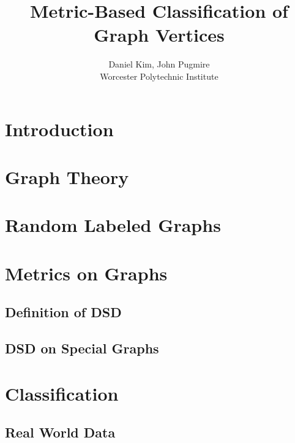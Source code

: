 \documentclass[11pt,oneside]{report}
\theoremstyle{definition}
\begin{document}
\title{Metric-Based Classification of Graph Vertices}
\author{Daniel Kim, John Pugmire\\Worcester Polytechnic Institute\\}
\maketitle
\tableofcontents


\chapter{Introduction}

\chapter{Graph Theory}

% 



\chapter{Random Labeled Graphs}



\chapter{Metrics on Graphs}

\section{Definition of DSD}


\section{DSD on Special Graphs}



\chapter{Classification}


\section{Real World Data}

\end{document}
